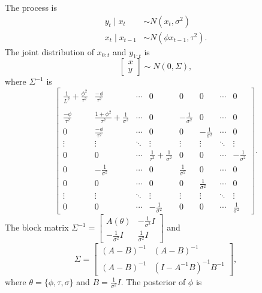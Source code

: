 The process is
\begin{align*}
y_t\mid x_t      &\sim N(x_t,\sigma^2) \\
x_t\mid x_{t-1} &\sim N(\phi x_{t-1},\tau^2).
\end{align*}
The joint distribution of $x_{0:t}$ and $y_{1:t}$ is
\begin{equation*}
\begin{bmatrix} x\\y \end{bmatrix}
\sim N\left(0, \Sigma  \right),
\end{equation*}
where $\Sigma^{-1}$ is
\begin{equation*}
\begin{bmatrix}
\frac{1}{L^2}+\frac{\phi^2}{\tau^2} & \frac{-\phi}{\tau^2} & \cdots & 0 & 0 & 0& \cdots & 0\\\\
\frac{-\phi}{\tau^2}   & \frac{1+\phi^2}{\tau^2}+\frac{1}{\sigma^2}& \cdots & 0 & -\frac{1}{\sigma^2} &0 & \cdots & 0 \\
0 & \frac{-\phi}{\tau^2}   &  \cdots & 0 & 0& -\frac{1}{\sigma^2} & \cdots & 0\\
\vdots & \vdots & \ddots & \vdots & \vdots & \vdots & \ddots & \vdots \\
0 & 0   &  \cdots & \frac{1}{\tau^2}+\frac{1}{\sigma^2} & 0 & 0 & \cdots &-\frac{1}{\sigma^2}\\
0 & -\frac{1}{\sigma^2}  & \cdots & 0 & \frac{1}{\sigma^2} & 0 & \cdots & 0 \\
0& 0 & \cdots & 0 & 0 &  \frac{1}{\sigma^2} & \cdots & 0\\
\vdots & \vdots & \ddots & \vdots & \vdots & \vdots & \ddots & \vdots\\
0 & 0& \cdots &-\frac{1}{\sigma^2} & 0 & 0 & \cdots &  \frac{1}{\sigma^2}
\end{bmatrix}.
\end{equation*}
The block matrix $\Sigma^{-1}=\begin{bmatrix} A(\theta) & -\frac{1}{\sigma^2}I \\ -\frac{1}{\sigma^2}I & \frac{1}{\sigma^2}I \end{bmatrix}$ and
\begin{equation*}
\Sigma =\begin{bmatrix} (A-B)^{-1} & (A-B)^{-1}\\(A-B)^{-1}& (I-A^{-1}B)^{-1}B^{-1} \end{bmatrix},
\end{equation*}
where $\theta =\{\phi,\tau,\sigma\}$ and $B=\frac{1}{\sigma^2}I$. The posterior of $\phi$ is 
